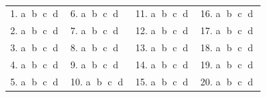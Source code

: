 \documentclass[12pt]{exam}
\begin{document}
 \\
\begin{tabular*}{\textwidth}{@{\extracolsep{\fill}}p{}p{}p{}p{}}
1. \textcircled{a} \textcircled{b} \textcircled{c} \textcircled{d} & 6. \textcircled{a} \textcircled{b} \textcircled{c} \textcircled{d} & 11. \textcircled{a} \textcircled{b} \textcircled{c} \textcircled{d} & 16. \textcircled{a} \textcircled{b} \textcircled{c} \textcircled{d} \\
2. \textcircled{a} \textcircled{b} \textcircled{c} \textcircled{d} & 7. \textcircled{a} \textcircled{b} \textcircled{c} \textcircled{d} & 12. \textcircled{a} \textcircled{b} \textcircled{c} \textcircled{d} & 17. \textcircled{a} \textcircled{b} \textcircled{c} \textcircled{d} \\
3. \textcircled{a} \textcircled{b} \textcircled{c} \textcircled{d} & 8. \textcircled{a} \textcircled{b} \textcircled{c} \textcircled{d} & 13. \textcircled{a} \textcircled{b} \textcircled{c} \textcircled{d} & 18. \textcircled{a} \textcircled{b} \textcircled{c} \textcircled{d} \\
4. \textcircled{a} \textcircled{b} \textcircled{c} \textcircled{d} & 9. \textcircled{a} \textcircled{b} \textcircled{c} \textcircled{d} & 14. \textcircled{a} \textcircled{b} \textcircled{c} \textcircled{d} & 19. \textcircled{a} \textcircled{b} \textcircled{c} \textcircled{d} \\
5. \textcircled{a} \textcircled{b} \textcircled{c} \textcircled{d} & 10. \textcircled{a} \textcircled{b} \textcircled{c} \textcircled{d} & 15. \textcircled{a} \textcircled{b} \textcircled{c} \textcircled{d} & 20. \textcircled{a} \textcircled{b} \textcircled{c} \textcircled{d} \\
\end{tabular*}
\end{document}
